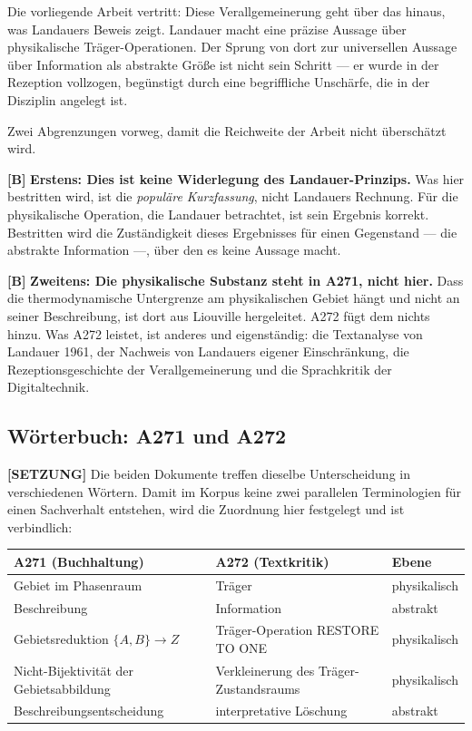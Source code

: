 Die vorliegende Arbeit vertritt: Diese Verallgemeinerung geht über das hinaus, was
Landauers Beweis zeigt. Landauer macht eine präzise Aussage über physikalische
Träger-Operationen. Der Sprung von dort zur universellen Aussage über Information
als abstrakte Größe ist nicht sein Schritt --- er wurde in der Rezeption
vollzogen, begünstigt durch eine begriffliche Unschärfe, die in der Disziplin
angelegt ist.

Zwei Abgrenzungen vorweg, damit die Reichweite der Arbeit nicht überschätzt wird.

\textbf{[B]} \textbf{Erstens: Dies ist keine Widerlegung des Landauer-Prinzips.} Was hier
bestritten wird, ist die \emph{populäre Kurzfassung}, nicht Landauers Rechnung.
Für die physikalische Operation, die Landauer betrachtet, ist sein Ergebnis
korrekt. Bestritten wird die Zuständigkeit dieses Ergebnisses für einen Gegenstand
--- die abstrakte Information ---, über den es keine Aussage macht.

\textbf{[B]} \textbf{Zweitens: Die physikalische Substanz steht in A271, nicht hier.} Dass
die thermodynamische Untergrenze am physikalischen Gebiet hängt und nicht an
seiner Beschreibung, ist dort aus Liouville hergeleitet. A272 fügt dem nichts
hinzu. Was A272 leistet, ist anderes und eigenständig: die Textanalyse von
Landauer 1961, der Nachweis von Landauers eigener Einschränkung, die
Rezeptionsgeschichte der Verallgemeinerung und die Sprachkritik der Digitaltechnik.

\subsection{Wörterbuch: A271 und A272}
\label{sec:woerterbuch}

\textbf{[SETZUNG]} Die beiden Dokumente treffen dieselbe Unterscheidung in verschiedenen Wörtern.
Damit im Korpus keine zwei parallelen Terminologien für einen Sachverhalt
entstehen, wird die Zuordnung hier festgelegt und ist verbindlich:

\begin{center}
\small
\begin{tabular}{@{}p{}p{}p{}@{}}
\toprule
\textbf{A271 (Buchhaltung)} & \textbf{A272 (Textkritik)} & \textbf{Ebene} \\
\midrule
Gebiet im Phasenraum & Träger & physikalisch \\
Beschreibung & Information & abstrakt \\
Gebietsreduktion $\{A,B\}\to Z$ & Träger-Operation \textup{RESTORE TO ONE} & physikalisch \\
Nicht-Bijektivität der Gebietsabbildung & Verkleinerung des Träger-Zustandsraums & physikalisch \\
Beschreibungsentscheidung & interpretative Löschung & abstrakt \\
\bottomrule
\end{tabular}
\end{center}

